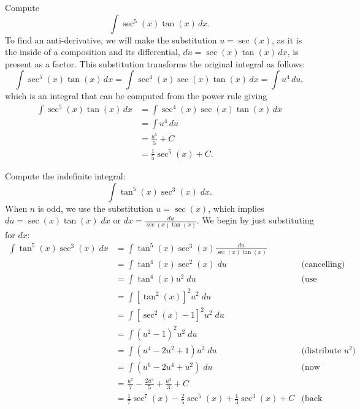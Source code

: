 \documentclass{ximera}
\begin{document}
\begin{example}[example 9]

Compute
\[
\int \sec^5(x) \tan(x) \, dx.
\]
To find an anti-derivative, we will make the substitution $u = \sec(x)$, as it is the inside of a composition
and its differential, $du = \sec(x)\tan(x) \, dx$, is present as a factor. 
This substitution transforms the original integral as follows:
\[
\int \sec^5(x) \tan(x) \, dx = \int \sec^4(x) \sec(x) \tan(x) \, dx= \int u^4 \, du,
\]
which is an integral that can be computed from the power rule giving
\begin{align*}
\int \sec^5(x) \tan(x) \, dx &= \int \sec^4(x) \sec(x) \tan(x) \, dx\\
                             &= \int u^4 \, du\\
                             &= \frac{u^5}{5} + C\\
                             &= \frac15 \sec^5(x) + C.
\end{align*}

\end{example}



\begin{example}[example 10]
Compute the indefinite integral:
\[
\int \tan^5(x) \sec^3(x)\;dx.
\]
When $n$ is odd, we use the substitution $u = \sec(x)$,
which implies $du = \sec(x) \tan(x) \; dx$ or $dx = \frac{du}{\sec(x)\tan(x)}$.
We begin by just substituting for $dx$:
\begin{align*}
\int \tan^5(x) \sec^3(x)\;dx &= \int \tan^5(x) \sec^3(x) \frac{du}{\sec(x)\tan(x)}\\
&= \int \tan^4(x) \sec^2(x) \; du & \text{(cancelling)}\\
&= \int \tan^4(x) u^2 \; du & \text{(use Pythagorean identity)}\\
&= \int \left[\tan^2(x)\right]^2 u^2 \; du \\
&= \int \left[\sec^2(x) -1\right]^2 u^2 \; du \\
&= \int \left(u^2 -1\right)^2 u^2 \; du \\
&= \int \left(u^4 - 2u^2 +1\right) u^2 \; du & \text{(distribute $u^2$)}\\
&= \int \left(u^6 - 2u^4 +u^2\right) \; du & \text{(now integrate)}\\
&=  \frac{u^7}{7} - \frac{2u^5}{5} + \frac{u^3}{3} + C  \\
&= \frac17\sec^7(x) - \frac25 \sec^5(x) + \frac13 \sec^3(x) + C & \text{(back substituting)}
\end{align*}
\end{example}
\end{document}

